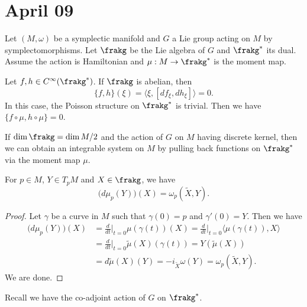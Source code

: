 \section{April 09}


  Let $(M, \omega)$ be a symplectic manifold and $G$ a Lie group acting on $M$ by symplectomorphisms.
  Let $\frakg$ be the Lie algebra of $G$ and $\frakg^*$ its dual.
  Assume the action is Hamiltonian and $\mu: M \to \frakg^*$ is the moment map.

  Let $f,h \in C^\infty(\frakg^*)$.
  If $\frakg$ is abelian, then 
  \[ \{f,h\}(\xi) = \langle \xi, [df_\xi, dh_\xi] \rangle = 0. \]
  In this case, the Poisson structure on $\frakg^*$ is trivial.
  Then we have $\{f \circ \mu, h \circ \mu\} = 0$.

  If $\dim \frakg = \dim M/2$ and the action of $G$ on $M$ having discrete kernel, then we can obtain an integrable system on $M$ by pulling back functions on $\frakg^*$ via the moment map $\mu$.


  \begin{lemma}
    For $p \in M$, $Y \in T_p M$ and $X \in \frakg$, we have 
    \[ \bigl(d \mu_p(Y)\bigr)(X) = \omega_p(\tilde{X}, Y). \]
  \end{lemma}
  \begin{proof}
    Let $\gamma$ be a curve in $M$ such that $\gamma(0) = p$ and $\gamma'(0) = Y$.
    Then we have
    \begin{align*}
      \bigl(d \mu_p(Y)\bigr)(X) &= \frac{d}{dt}\Big|_{t=0} \mu(\gamma(t))(X) = \frac{d}{dt}\Big|_{t=0} \langle \mu(\gamma(t)), X \rangle \\
        & = \frac{d}{dt}\Big|_{t=0} \tilde{\mu}(X)(\gamma(t)) = Y(\tilde{\mu}(X)) \\
        & = d \tilde{\mu}(X) (Y) = -i_{\tilde{X}} \omega (Y) = \omega_p(\tilde{X}, Y).
    \end{align*} 
    We are done.
  \end{proof}

  Recall we have the co-adjoint action of $G$ on $\frakg^*$.

